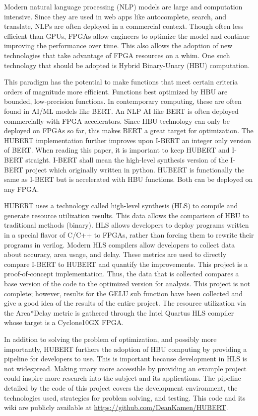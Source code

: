 \documentclass[12pt]{article}
\begin{document}
	Modern natural language processing (NLP) models are large and computation intensive. Since they are used in web apps like autocomplete, search, and translate, NLPs are often deployed in a commercial context. Though often less efficient than GPUs, FPGAs allow engineers to optimize the model and continue improving the performance over time. This also allows the adoption of new technologies that take advantage of FPGA resources on a whim. One such technology that should be adopted is Hybrid Binary-Unary (HBU) computation.
	
	This paradigm has the potential to make functions that meet certain criteria orders of magnitude more efficient. Functions best optimized by HBU are bounded, low-precision functions. In contemporary computing, these are often found in AI/ML models like BERT. An NLP AI like BERT \cite{bert} is often deployed commercially with FPGA accelerators. Since HBU technology can only be deployed on FPGAs so far, this makes BERT a great target for optimization. The HUBERT implementation further improves upon I-BERT \cite{ibert} an integer only version of BERT. When reading this paper, it is important to keep HUBERT and I-BERT straight. I-BERT shall mean the high-level synthesis version of the I-BERT project which originally written in python. HUBERT is functionally the same as I-BERT but is accelerated with HBU functions. Both can be deployed on any FPGA.
	
	HUBERT uses a technology called high-level synthesis (HLS) to compile and generate resource utilization results. This data allows the comparison of HBU to traditional methods (binary). HLS allows developers to deploy programs written in a special flavor of C/C++ to FPGAs, rather than forcing them to rewrite their programs in verilog. Modern HLS compilers allow developers to collect data about accuracy, area usage, and delay. These metrics are used to directly compare I-BERT to HUBERT and quantify the improvements.
	This project is a proof-of-concept implementation. Thus, the data that is collected compares a base version of the code to the optimized version for analysis. This project is not complete; however, results for the GELU sub function have been collected and give a good idea of the results of the entire project. The resource utilization via the Area*Delay metric is gathered through the Intel Quartus HLS compiler whose target is a Cyclone10GX FPGA.
	
	In addition to solving the problem of optimization, and possibly more importantly, HUBERT furthers the adoption of HBU computing by providing a pipeline for developers to use. This is important because development in HLS is not widespread. Making unary more accessible by providing an example project could inspire more research into the subject and its applications. The pipeline detailed by the code of this project covers the development environment, the technologies used, strategies for problem solving, and testing. This code and its wiki are publicly available at \url{https://github.com/DeanKamen/HUBERT}.
	
\end{document}
